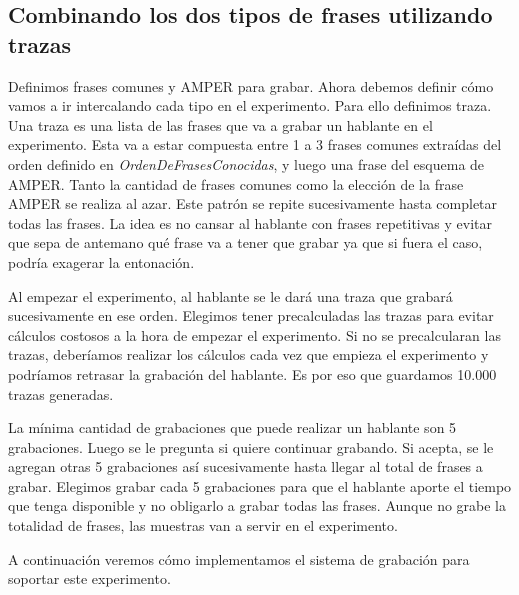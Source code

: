 \subsection{Combinando los dos tipos de frases utilizando trazas}

Definimos frases comunes y AMPER para grabar. Ahora debemos definir cómo vamos a ir intercalando cada tipo en el experimento. Para ello definimos traza. Una traza es una lista de las frases que va a grabar un hablante en el experimento. Esta va a estar compuesta entre 1 a 3 frases comunes extraídas del orden definido en \textit{OrdenDeFrasesConocidas}, y luego una frase del esquema de AMPER. Tanto la cantidad de frases comunes como la elección de la frase AMPER se realiza al azar. Este patrón se repite sucesivamente hasta completar todas las frases. La idea es no cansar al hablante con frases repetitivas y evitar que sepa de antemano qué frase va a tener que grabar ya que si fuera el caso, podría exagerar la entonación.

Al empezar el experimento, al hablante se le dará una traza que grabará sucesivamente en ese orden. Elegimos tener precalculadas las trazas para evitar cálculos costosos a la hora de empezar el experimento. Si no se precalcularan las trazas, deberíamos realizar los cálculos cada vez que empieza el experimento y podríamos retrasar la grabación del hablante. Es por eso que guardamos 10.000 trazas generadas. 

La mínima cantidad de grabaciones que puede realizar un hablante son 5 grabaciones. Luego se le pregunta si quiere continuar grabando. Si acepta, se le agregan otras 5 grabaciones así sucesivamente hasta llegar al total de frases a grabar. Elegimos grabar cada 5 grabaciones para que el hablante aporte el tiempo que tenga disponible y no obligarlo a grabar todas las frases. Aunque no grabe la totalidad de frases, las muestras van a servir en el experimento.

A continuación veremos cómo implementamos el sistema de grabación para soportar este experimento.